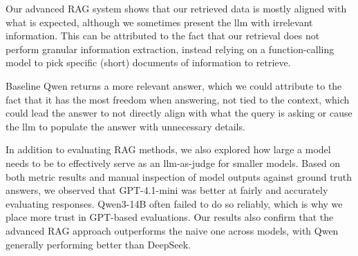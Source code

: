 \documentclass[fleqn,moreauthors,10pt]{ds_report}
\begin{document}
Our advanced RAG system shows that our retrieved data is mostly aligned with what is expected, although we sometimes present the \ac{llm} with irrelevant information. This can be attributed to the fact that our retrieval does not perform granular information extraction, instead relying on a function-calling model to pick specific (short) documents of information to retrieve.

Baseline Qwen returns a more relevant answer, which we could attribute to the fact that it has the most freedom when answering, not tied to the context, which could lead the answer to not directly align with what the query is asking or cause the \ac{llm} to populate the answer with unnecessary details.

In addition to evaluating RAG methods, we also explored how large a model needs to be to effectively serve as an \ac{llm}-as-judge for smaller models. Based on both metric results and manual inspection of model outputs against ground truth answers, we observed that GPT-4.1-mini was better at fairly and accurately evaluating responses. Qwen3-14B often failed to do so reliably, which is why we place more trust in GPT-based evaluations. Our results also confirm that the advanced RAG approach outperforms the naive one across models, with Qwen generally performing better than DeepSeek.




\end{document}
